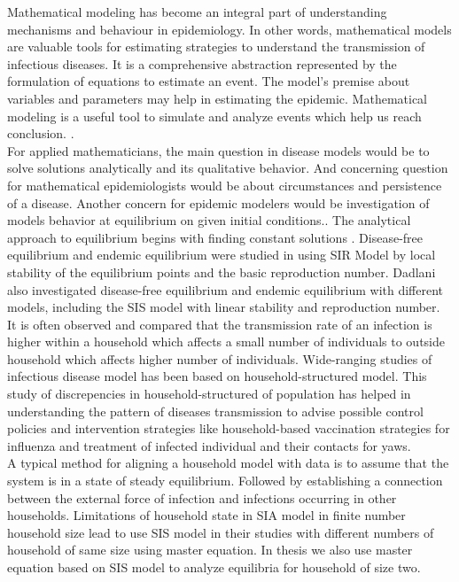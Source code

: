 \documentclass[paper=a4, fontsize=11pt, twoside, BCOR=12mm, parskip=full, listof=totoc]{scrreprt}
\begin{document}
Mathematical modeling has become an integral part of understanding mechanisms and behaviour in epidemiology. In other words, mathematical models are valuable tools for estimating strategies to understand the transmission of infectious diseases. It is a comprehensive abstraction represented by the formulation of equations to estimate an event. The model's premise about variables and parameters may help in estimating the epidemic. Mathematical modeling is a useful tool to simulate and analyze events which help us reach conclusion. \cite{hethcote2000mathematics}.\\

For applied mathematicians, the main question in disease models would be to solve solutions analytically and its qualitative behavior. And concerning question for mathematical epidemiologists would be about circumstances and persistence of a disease. Another concern for epidemic modelers would be investigation of models behavior at equilibrium on given initial conditions.\cite{sattenspiel1990modeling}. The analytical approach to equilibrium begins with finding constant solutions \cite{brauer2017mathematical}. Disease-free equilibrium and endemic equilibrium were studied in \cite{egbetade2018local} using SIR Model by local stability of the equilibrium points and the basic reproduction number. Dadlani \cite{dadlani2020deterministic} also investigated disease-free equilibrium and endemic equilibrium with different models, including the SIS model with linear stability and reproduction number.\\ 

It is often observed and compared that the transmission rate of an infection is higher within a household which affects a small number of individuals to outside household which affects higher number of individuals. Wide-ranging studies of infectious disease model has been based on household-structured model. This study of discrepencies in household-structured of population has helped in understanding the pattern of diseases transmission to advise possible control policies and intervention strategies like household-based vaccination strategies for influenza and treatment of infected individual and their contacts for yaws\cite{holmes2022approximating}. \\

A typical method for aligning a household model with data is to assume that the system is in a state of steady equilibrium. Followed by establishing a connection between the external force of infection and infections occurring in other households\cite{holmes2022approximating}. Limitations of household state in SIA model in finite number household size lead \cite{holmes2022approximating} to use SIS model in their studies with different numbers of household of same size using master equation. In thesis we also use master equation based on SIS model to analyze equilibria for household of size two.\\
\end{document}
